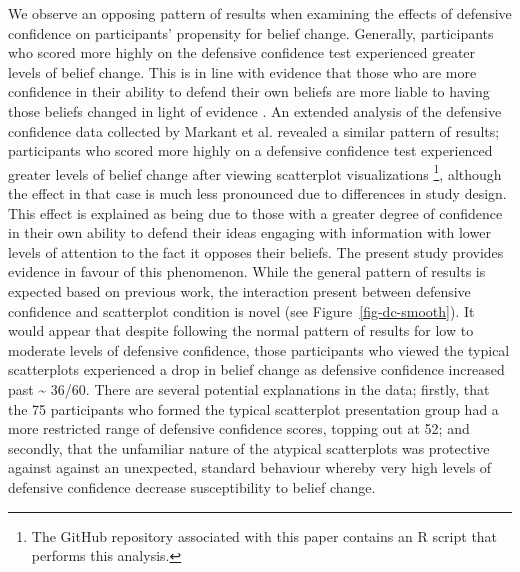 \documentclass[manuscript,screen,review,anonymous]{acmart}
\begin{document}
We observe an opposing pattern of results when examining the effects of
defensive confidence on participants' propensity for belief change.
Generally, participants who scored more highly on the defensive
confidence test experienced greater levels of belief change. This is in
line with evidence that those who are more confidence in their ability
to defend their own beliefs are more liable to having those beliefs
changed in light of evidence \citep{albarracin_2004}. An extended
analysis of the defensive confidence data collected by Markant et al.
\citep{markant_2023} revealed a similar pattern of results; participants
who scored more highly on a defensive confidence test experienced
greater levels of belief change after viewing scatterplot visualizations
\footnote{The GitHub repository associated with this paper contains an R
  script that performs this analysis.}, although the effect in that case
is much less pronounced due to differences in study design. This effect
is explained as being due to those with a greater degree of confidence
in their own ability to defend their ideas engaging with information
with lower levels of attention to the fact it opposes their beliefs. The
present study provides evidence in favour of this phenomenon. While the
general pattern of results is expected based on previous work, the
interaction present between defensive confidence and scatterplot
condition is novel (see Figure~\ref{fig-dc-smooth}). It would appear
that despite following the normal pattern of results for low to moderate
levels of defensive confidence, those participants who viewed the
typical scatterplots experienced a drop in belief change as defensive
confidence increased past \textasciitilde{} 36/60. There are several
potential explanations in the data; firstly, that the 75 participants
who formed the typical scatterplot presentation group had a more
restricted range of defensive confidence scores, topping out at 52; and
secondly, that the unfamiliar nature of the atypical scatterplots was
protective against against an unexpected, standard behaviour whereby
very high levels of defensive confidence decrease susceptibility to
belief change.
\end{document}
